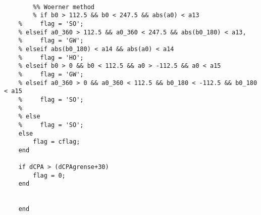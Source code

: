 \begin{lstlisting}
        
        %% Woerner method
        % if b0 > 112.5 && b0 < 247.5 && abs(a0) < a13
    %     flag = 'SO';
    % elseif a0_360 > 112.5 && a0_360 < 247.5 && abs(b0_180) < a13,
    %     flag = 'GW';
    % elseif abs(b0_180) < a14 && abs(a0) < a14
    %     flag = 'HO';
    % elseif b0 > 0 && b0 < 112.5 && a0 > -112.5 && a0 < a15
    %     flag = 'GW';
    % elseif a0_360 > 0 && a0_360 < 112.5 && b0_180 < -112.5 && b0_180 < a15
    %     flag = 'SO';
    %     
    % else
    %     flag = 'SO';
    else
        flag = cflag;
    end
    
    if dCPA > (dCPAgrense+30)
        flag = 0;
    end
    
    
    end

\end{lstlisting}